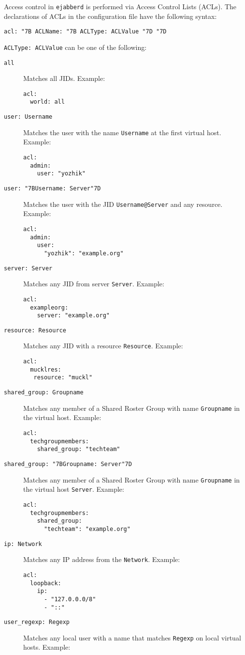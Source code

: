 \documentclass[a4paper,10pt]{book}
\newcommand{\bracehack}{\def\{{\char"7B}\def\}{\char"7D}}
\newcommand{\titem}[1]{\item[\bracehack\texttt{#1}]}
\newcommand{\term}[1]{\texttt{#1}}
\newcommand{\ejabberd}{\texttt{ejabberd}}
\newcommand{\esyntax}[1]{\begin{description}\titem{#1}\end{description}}
\begin{document}
Access control in \ejabberd{} is performed via Access Control Lists (ACLs). The
declarations of ACLs in the configuration file have the following syntax:
\esyntax{acl: \{ ACLName: \{ ACLType: ACLValue \} \}}

\term{ACLType: ACLValue} can be one of the following:
\begin{description}
\titem{all} Matches all JIDs. Example:
\begin{verbatim}
acl:
  world: all
\end{verbatim}
\titem{user: Username} Matches the user with the name
  \term{Username} at the first virtual host. Example:
\begin{verbatim}
acl:
  admin:
    user: "yozhik"
\end{verbatim}
\titem{user: \{Username: Server\}} Matches the user with the JID
  \term{Username@Server} and any resource. Example:
\begin{verbatim}
acl:
  admin:
    user:
      "yozhik": "example.org"
\end{verbatim}
\titem{server: Server} Matches any JID from server
  \term{Server}. Example:
\begin{verbatim}
acl:
  exampleorg:
    server: "example.org"
\end{verbatim}
\titem{resource: Resource} Matches any JID with a resource
  \term{Resource}. Example:
\begin{verbatim}
acl:
  mucklres:
   resource: "muckl"
\end{verbatim}
\titem{shared\_group: Groupname} Matches any member of a Shared Roster Group with name \term{Groupname} in the virtual host. Example:
\begin{verbatim}
acl:
  techgroupmembers:
    shared_group: "techteam"
\end{verbatim}
\titem{shared\_group: \{Groupname: Server\}} Matches any member of a Shared Roster Group with name \term{Groupname} in the virtual host \term{Server}. Example:
\begin{verbatim}
acl:
  techgroupmembers:
    shared_group:
      "techteam": "example.org"
\end{verbatim}
\titem{ip: Network} Matches any IP address from the \term{Network}. Example:
\begin{verbatim}
acl:
  loopback:
    ip:
      - "127.0.0.0/8"
      - "::"
\end{verbatim}
\titem{user\_regexp: Regexp} Matches any local user with a name that
  matches \term{Regexp} on local virtual hosts. Example:
\begin{verbatim}

\end{verbatim}
\end{description}
\end{document}
